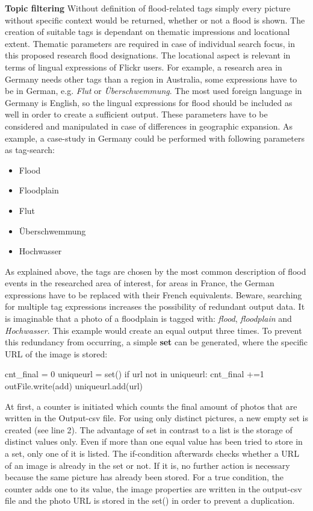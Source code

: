 \textbf{Topic filtering}
Without definition of flood-related tags simply every picture without specific context would be returned, whether or not a flood is shown. The creation of suitable tags is dependant on thematic impressions and locational extent. Thematic parameters are required in case of individual search focus, in this proposed research flood designations. The locational aspect is relevant in terms of lingual expressions of Flickr users. For example, a research area in Germany needs other tags than a region in Australia, some expressions have to be in German, e.g. \emph{Flut} or \emph{\"Uberschwemmung}. The most used foreign language in Germany is English, so the lingual expressions for flood should be included as well in order to create a sufficient output. These parameters have to be considered and manipulated in case of differences in geographic expansion. As example, a case-study in Germany could be performed with following parameters as tag-search: 
\begin{itemize}
\item Flood
\item Floodplain
\item Flut
\item \"Uberschwemmung
\item Hochwasser
\end{itemize}
As explained above, the tags are chosen by the most common description of flood events in the researched area of interest, for areas in France, the German expressions have to be replaced with their French equivalents. Beware, searching for multiple tag expressions increases the possibility of redundant output data. It is imaginable that a photo of a floodplain is tagged with: \emph{flood}, \emph{floodplain} and  \emph{Hochwasser}. This example would create an equal output three times. To prevent this redundancy from occurring, a simple \textbf{set} can be generated, where the specific URL of the image is stored:
\begin{python}[linewidth=6cm]
cnt_final = 0
uniqueurl = set()
if url not in uniqueurl:
  cnt_final +=1            
  outFile.write(add)
  uniqueurl.add(url)
\end{python}
At first, a counter is initiated which counts the final amount of photos that are written in the Output-csv file. For using only distinct pictures, a new empty set is created (see line 2). The advantage of set in contrast to a list is the storage of distinct values only. Even if more than one equal value has been tried to store in a set, only one of it is listed. The if-condition afterwards checks whether a URL of an image is already in the set or not. If it is, no further action is necessary because the same picture has already been stored. For a true condition, the counter adds one to its value, the image properties are written in the output-csv file and the photo URL is stored in the set() in order to prevent a duplication.

